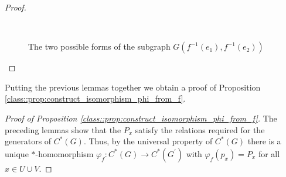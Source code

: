 \documentclass[a4paper]{amsart}
\begin{document}
\begin{proof}
\begin{figure}[htb]
        $\quad$
        \caption{The two possible forms of the subgraph $G(f^{-1}(e_1), f^{-1}(e_2))$}
        \label{class::fig:G(f^-1(e_1), f^-1(e_2))}
    \end{figure}
\end{proof}

Putting the previous lemmas together we obtain a proof of Proposition \ref{class::prop:construct_isomorphism_phi_from_f}.

\begin{proof}[Proof of Proposition \ref{class::prop:construct_isomorphism_phi_from_f}]
    The preceding lemmas show that the $P_x$ satisfy the relations required for the generators of $C^\ast(G)$. Thus, by the universal property of $C^\ast(G)$ there is a unique $\ast$-homomorphism $\varphi_f: C^\ast(G) \to C^\ast(G^\prime)$ with $\varphi_f(p_x) = P_x$ for all $x \in U \cup V$.     
\end{proof}
\end{document}
